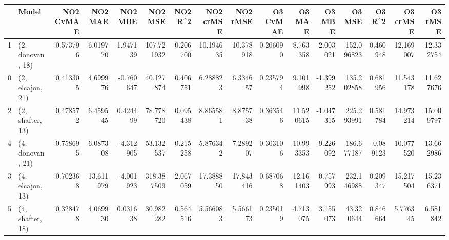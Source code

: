 \begin{tabular}{llrrrrrrrrrrrrrr}
\toprule
{} &             Model &  NO2 CvMAE &    NO2 MAE &   NO2 MBE &     NO2 MSE &   NO2 R\textasciicircum2 &  NO2 crMSE &   NO2 rMSE &  O3 CvMAE &     O3 MAE &    O3 MBE &      O3 MSE &    O3 R\textasciicircum2 &   O3 crMSE &    O3 rMSE \\
\midrule
1 &  (2, donovan, 18) &   0.573796 &   6.019770 &  1.947139 &  107.721932 &  0.206700 &  10.194635 &  10.378918 &  0.206090 &   8.763358 &  2.003021 &  152.096823 &  0.460948 &  12.169007 &  12.332754 \\
0 &  (2, elcajon, 21) &   0.413305 &   4.699976 & -0.760647 &   40.127874 &  0.406751 &   6.288823 &   6.334657 &  0.235794 &   9.101998 & -1.399252 &  135.202858 &  0.681956 &  11.543178 &  11.627676 \\
2 &  (2, shafter, 13) &   0.478572 &   6.459545 &  0.424499 &   78.778720 &  0.095438 &   8.865581 &   8.875738 &  0.363546 &  11.520615 & -1.047315 &  225.293991 &  0.581784 &  14.973214 &  15.009797 \\
4 &  (4, donovan, 21) &   0.758695 &   6.087308 & -4.312905 &   53.132537 &  0.215258 &   5.876342 &   7.289207 &  0.303106 &  10.993353 &  9.226092 &  186.677187 & -0.089123 &  10.077520 &  13.662986 \\
3 &  (4, elcajon, 13) &   0.702368 &  13.611979 & -4.001923 &  318.387509 & -2.067059 &  17.388850 &  17.843416 &  0.687068 &  12.161403 &  0.757993 &  232.146988 &  0.209347 &  15.217504 &  15.236371 \\
5 &  (4, shafter, 18) &   0.328478 &   4.069930 &  0.031638 &   30.982282 &  0.564516 &   5.566083 &   5.566173 &  0.235019 &   4.713075 &  3.155073 &   43.320644 &  0.846664 &   5.776345 &   6.581842 \\
\bottomrule
\end{tabular}
